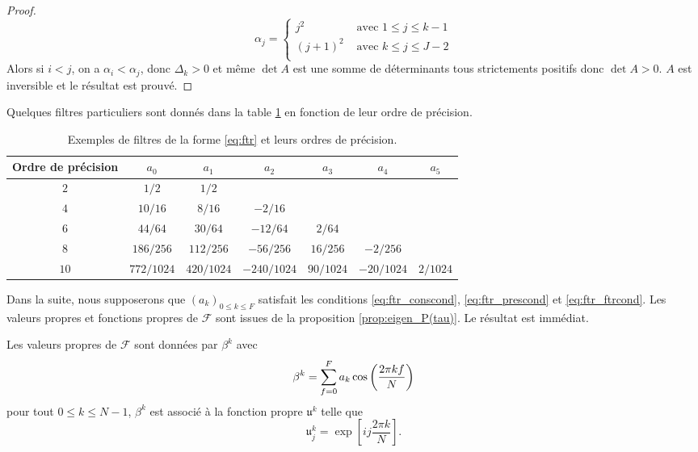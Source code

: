 \begin{proof}
\begin{equation}
\alpha_j = \left\lbrace
\begin{array}{ll}
j^2 & \text{ avec } 1 \leq j \leq k-1\\
(j+1)^2 & \text{ avec } k \leq j \leq J-2\\
\end{array}
\right.
\end{equation}
Alors si $i<j$, on a $\alpha_i < \alpha_j$, donc $\Delta_k>0$ et même $\det A$ est une somme de déterminants tous strictements positifs donc $\det A > 0$. $A$ est inversible et le résultat est prouvé.
\end{proof}
Quelques filtres particuliers sont donnés dans la table \ref{tab:filter} en fonction de leur ordre de précision.

\begin{table}[htbp]
\begin{center}
\begin{tabular}{|c||cccccc|}
\hline
\textbf{Ordre de précision} & $a_0$ & $a_1$ & $a_2$ & $a_3$ & $a_4$ & $a_5$ \\
\hline \hline
$2$ & $1/2$ & $1/2$ & & & & \\
\hline
$4$ & $10/16$ & $8/16$ & $-2/16$ & & & \\
\hline
$6$ & $44/64$ & $30/64$ & $-12/64$ & $2/64$ & & \\
\hline
$8$ & $186/256$ & $112/256$ & $-56/256$ & $16/256$ & $-2/256$ & \\
\hline
$10$ & $772/1024$ & $420/1024$ & $-240/1024$ & $90/1024$ & $-20/1024$ & $2/1024$ \\
\hline
\end{tabular}
\end{center}
\caption{Exemples de filtres de la forme \eqref{eq:ftr} et leurs ordres de précision.}
\label{tab:filter}
\end{table}

Dans la suite, nous supposerons que $(a_k)_{0 \leq k \leq F}$ satisfait les conditions \eqref{eq:ftr_conscond}, \eqref{eq:ftr_prescond} et \eqref{eq:ftr_ftrcond}.
Les valeurs propres et fonctions propres de $\mathcal{F}$ sont issues de la proposition \ref{prop:eigen_P(tau)}. Le résultat est immédiat.

\begin{theoreme}
Les valeurs propres de $\mathcal{F}$ sont données par $\beta^k$ avec 
\begin{equation}
\beta^k = \displaystyle\sum\limits_{f=0}^F a_k \cos \left( \dfrac{2 \pi k f}{N} \right)
\end{equation}
pour tout $0 \leq k \leq N-1$, $\beta^k$ est associé à la fonction propre $\mathfrak{u}^k$ telle que 
\begin{equation}
\mathfrak{u}^k_j = \exp \left[ i j \dfrac{2 \pi k}{N} \right].
\end{equation}
\end{theoreme}

